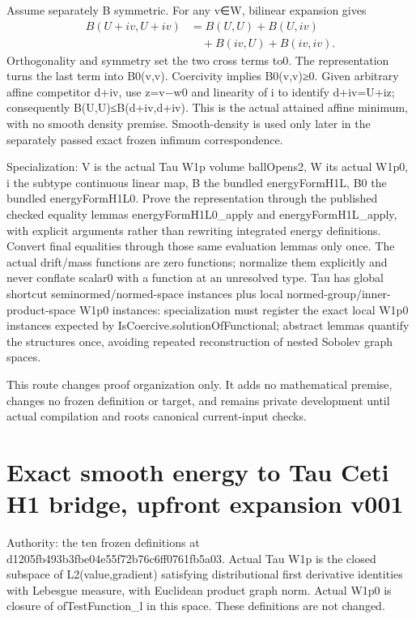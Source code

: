 \documentclass[11pt]{article}
\theoremstyle{definition}
\theoremstyle{remark}
\numberwithin{equation}{section}
\begin{document}
Assume separately B symmetric. For any v∈W, bilinear expansion gives
\begin{align*}B(U+iv,U+iv)&=B(U,U)+B(U,iv)\\ &\quad+B(iv,U)+B(iv,iv).\end{align*} Orthogonality and symmetry
set the two cross terms to0. The representation turns the last term into
B0(v,v). Coercivity implies B0(v,v)≥0. Given arbitrary affine competitor
d+iv, use z=v−w0 and linearity of i to identify d+iv=U+iz; consequently
B(U,U)≤B(d+iv,d+iv). This is the actual attained affine minimum, with no
smooth density premise. Smooth-density is used only later in the
separately passed exact frozen infimum correspondence.

Specialization: V is the actual Tau W1p volume ballOpens2, W its actual
W1p0, i the subtype continuous linear map, B the bundled energyFormH1L,
B0 the bundled energyFormH1L0. Prove the representation through the
published checked equality lemmas energyFormH1L0\_apply and
energyFormH1L\_apply, with explicit arguments rather than rewriting
integrated energy definitions. Convert final equalities through those
same evaluation lemmas only once. The actual drift/mass functions are
zero functions; normalize them explicitly and never conflate scalar0
with a function at an unresolved type. Tau has global shortcut
seminormed/normed-space instances plus local
normed-group/inner-product-space W1p0 instances: specialization must
register the exact local W1p0 instances expected by
IsCoercive.solutionOfFunctional; abstract lemmas quantify the structures
once, avoiding repeated reconstruction of nested Sobolev graph spaces.

This route changes proof organization only. It adds no mathematical
premise, changes no frozen definition or target, and remains private
development until actual compilation and root\textquotesingle s
canonical current-input checks.

\clearpage
\hypertarget{source-1efa4a952efe-exact-smooth-energy-to-tau-ceti-h1-bridge-upfront-expansion-v001}{%
\section{Exact smooth energy to Tau Ceti H1 bridge, upfront expansion
v001}\label{source-1efa4a952efe-exact-smooth-energy-to-tau-ceti-h1-bridge-upfront-expansion-v001}}

Authority: the ten frozen definitions at
d1205fb493b3fbe04e55f72b76c6ff0761fb5a03. Actual Tau W1p is the closed
subspace of L2(value,gradient) satisfying distributional first
derivative identities with Lebesgue measure, with Euclidean product
graph norm. Actual W1p0 is closure of ofTestFunction\_l in this space.
These definitions are not changed.
\end{document}
